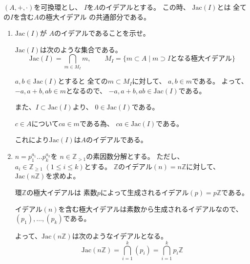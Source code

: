 \documentclass[12pt,b5paper]{ltjsarticle}
\begin{document}
\hrulefill

$(A,+,\cdot)$を可換環とし、
$I$を$A$のイデアルとする。
この時、
$\mathrm{Jac}(I)$とは
全ての$I$を含む$A$の極大イデアル
の共通部分である。

\begin{enumerate}
 \item
      $\mathrm{Jac}(I)$が
      $A$のイデアルであることを示せ。

      \dotfill

      $\mathrm{Jac}(I)$は次のような集合である。
      \begin{equation}
       \mathrm{Jac}(I)
        = \bigcap_{m\in M_{I}} m
        ,\qquad
        M_{I}=\{m \subset A \mid m \supset I となる極大イデアル\}
      \end{equation}


      $a,b\in\mathrm{Jac}(I)$とすると
      全ての$m \subset M_{I}$に対して、
      $a,b\in m$である。
      よって、
      $-a,a+b,ab\in m$となるので、
      $-a,a+b,ab\in\mathrm{Jac}(I)$である。

      また、$I \subset \mathrm{Jac}(I)$より、
      $0\in \mathrm{Jac}(I)$である。

      $c \in A$について$ca\in m$である為、
      $ca\in \mathrm{Jac}(I)$である。

      これにより$\mathrm{Jac}(I)$は$A$のイデアルである。

      \hrulefill

 \item
      $n=p_{1}^{a_{1}}\dots p_{k}^{a_{k}}$を
      $n\in \mathbb{Z}_{>1}$の素因数分解とする。
      ただし、$a_{i}\in\mathbb{Z}_{\geq 1}\; (1\leq i \leq k)$とする。
      $\mathbb{Z}$のイデアル$(n)=n\mathbb{Z}$に対して、
      $\mathrm{Jac}(n\mathbb{Z})$を求めよ。

      \dotfill

      環$\mathbb{Z}$の極大イデアルは
      素数$p$によって生成されるイデアル$(p)=p\mathbb{Z}$である。

      イデアル$(n)$を含む極大イデアルは素数から生成されるイデアルなので、
      $(p_{1}),\dots,(p_{k})$である。

      よって、$\mathrm{Jac}(n\mathbb{Z})$は次のようなイデアルとなる。
      \begin{equation}
       \mathrm{Jac}(n\mathbb{Z})
        = \bigcap_{i=1}^{k} (p_{i})
        = \bigcap_{i=1}^{k} p_{i}\mathbb{Z}
      \end{equation}

      \hrulefill

\end{enumerate}




\hrulefill
\end{document}
